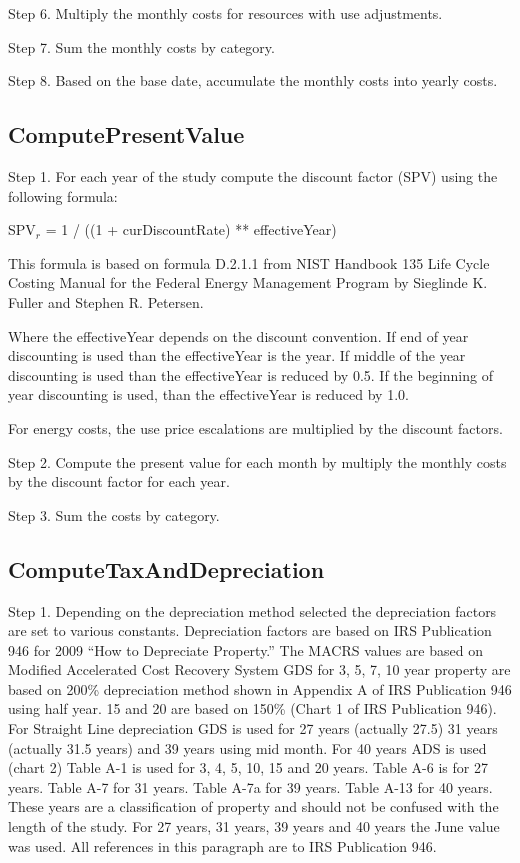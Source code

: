 Step 6. Multiply the monthly costs for resources with use adjustments.

Step 7. Sum the monthly costs by category.

Step 8. Based on the base date, accumulate the monthly costs into yearly costs.

\subsection{ComputePresentValue}\label{computepresentvalue}

Step 1. For each year of the study compute the discount factor (SPV) using the following formula:

SPV\(_{r}\) = 1 / ((1 + curDiscountRate) ** effectiveYear)

This formula is based on formula D.2.1.1 from NIST Handbook 135 Life Cycle Costing Manual for the Federal Energy Management Program by Sieglinde K. Fuller and Stephen R. Petersen.

Where the effectiveYear depends on the discount convention. If end of year discounting is used than the effectiveYear is the year. If middle of the year discounting is used than the effectiveYear is reduced by 0.5. If the beginning of year discounting is used, than the effectiveYear is reduced by 1.0.

For energy costs, the use price escalations are multiplied by the discount factors.

Step 2. Compute the present value for each month by multiply the monthly costs by the discount factor for each year.

Step 3. Sum the costs by category.

\subsection{ComputeTaxAndDepreciation}\label{computetaxanddepreciation}

Step 1. Depending on the depreciation method selected the depreciation factors are set to various constants. Depreciation factors are based on IRS Publication 946 for 2009 ``How to Depreciate Property.'' The MACRS values are based on Modified Accelerated Cost Recovery System GDS for 3, 5, 7, 10 year property are based on 200\% depreciation method shown in Appendix A of IRS Publication 946 using half year. 15 and 20 are based on 150\% (Chart 1 of IRS Publication 946). For Straight Line depreciation GDS is used for 27 years (actually 27.5) 31 years (actually 31.5 years) and 39 years using mid month. For 40 years ADS is used (chart 2) Table A-1 is used for 3, 4, 5, 10, 15 and 20 years. Table A-6 is for 27 years. Table A-7 for 31 years. Table A-7a for 39 years. Table A-13 for 40 years. These years are a classification of property and should not be confused with the length of the study. For 27 years, 31 years, 39 years and 40 years the June value was used. All references in this paragraph are to IRS Publication 946.

